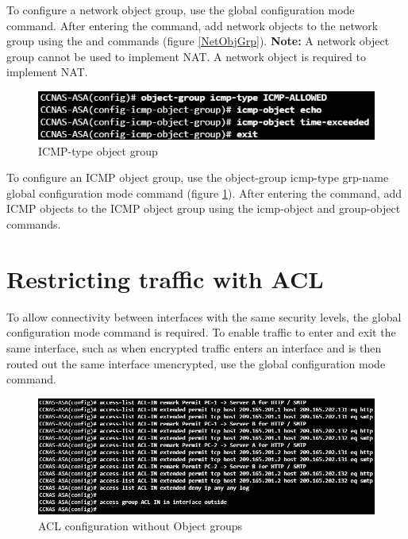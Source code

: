 To configure a network object group, use the  global configuration mode command. After entering the command, add network objects to the network group using the  and  commands (figure \ref{NetObjGrp}). \textbf{Note:} A network object group cannot be used to implement NAT. A network object is required to implement NAT.\\

\begin{figure}[hbtp]
\caption{ICMP-type object group}\label{ICMPobjgrp}
\centering
\includegraphics[scale=0.5]{pictures/ICMPobjgrp.PNG}
\end{figure}


To configure an ICMP object group, use the object-group icmp-type grp-name global configuration mode command (figure \ref{ICMPobjgrp}). After entering the command, add ICMP objects to the ICMP object group using the icmp-object and group-object commands.\\

\section{Restricting traffic with ACL}

To allow connectivity between interfaces with the same security levels, the  global configuration mode command is required. To enable traffic to enter and exit the same interface, such as when encrypted traffic enters an interface and is then routed out the same interface unencrypted, use the  global configuration mode command.\\

\begin{figure}[hbtp]
\caption{ACL configuration without Object groups}\label{withoutObj}
\centering
\includegraphics[scale=0.7]{pictures/withoutObj.PNG}
\end{figure}


